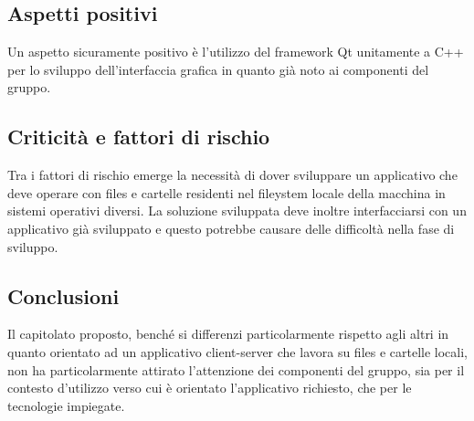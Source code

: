 \subsection{Aspetti positivi}
Un aspetto sicuramente positivo è l’utilizzo del framework Qt unitamente a C++  per lo sviluppo dell’interfaccia grafica in quanto già noto ai componenti del gruppo.


\subsection{Criticità e fattori di rischio}
Tra i fattori di rischio emerge la necessità di dover sviluppare un applicativo che deve operare con files e cartelle residenti nel fileystem locale della macchina in sistemi operativi diversi.
La soluzione sviluppata deve inoltre interfacciarsi con un applicativo già sviluppato e questo potrebbe causare delle difficoltà nella fase di sviluppo.

\subsection{Conclusioni}
Il capitolato proposto, benché si differenzi particolarmente rispetto agli altri in quanto orientato ad un applicativo client-server che lavora su files e cartelle locali, non ha particolarmente attirato l’attenzione dei componenti del gruppo, sia per il contesto d'utilizzo verso cui è orientato l’applicativo richiesto, che per le tecnologie impiegate.

\newpage
